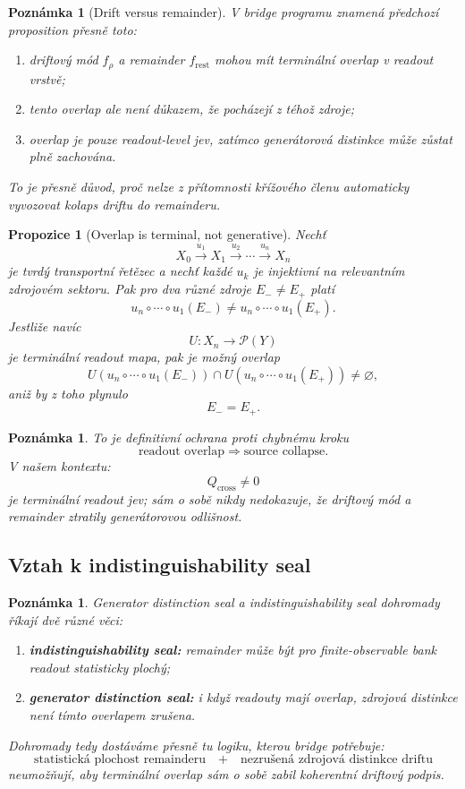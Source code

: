 \documentclass[11pt,a4paper]{article}
\newtheorem{remark}[theorem]{Poznámka}
\newtheorem{proposition}[theorem]{Propozice}
\begin{document}
\begin{remark}[Drift versus remainder]
V bridge programu znamená předchozí proposition přesně toto:
\begin{enumerate}[label=\textbf{(\arabic*)}]
    \item driftový mód \(f_\rho\) a remainder \(f_{\mathrm{rest}}\) mohou mít terminální overlap v readout vrstvě;
    \item tento overlap ale není důkazem, že pocházejí z téhož zdroje;
    \item overlap je pouze readout-level jev, zatímco generátorová distinkce může zůstat plně zachována.
\end{enumerate}
To je přesně důvod, proč nelze z přítomnosti křížového členu automaticky vyvozovat
kolaps driftu do remainderu.
\end{remark}

\begin{proposition}[Overlap is terminal, not generative]
Nechť
\[
X_0 \xrightarrow{u_1} X_1 \xrightarrow{u_2}\cdots\xrightarrow{u_n} X_n
\]
je tvrdý transportní řetězec a nechť každé \(u_k\) je injektivní na relevantním zdrojovém sektoru.
Pak pro dva různé zdroje \(E_-\neq E_+\) platí
\[
u_n\circ\cdots\circ u_1(E_-)\neq u_n\circ\cdots\circ u_1(E_+).
\]
Jestliže navíc
\[
U:X_n\to \mathcal P(Y)
\]
je terminální readout mapa, pak je možný overlap
\[
U(u_n\circ\cdots\circ u_1(E_-))\cap U(u_n\circ\cdots\circ u_1(E_+))\neq \varnothing,
\]
aniž by z toho plynulo
\[
E_-=E_+.
\]
\end{proposition}

\begin{remark}
To je definitivní ochrana proti chybnému kroku
\[
\text{readout overlap} \Longrightarrow \text{source collapse}.
\]
V našem kontextu:
\[
Q_{\mathrm{cross}}\neq 0
\]
je terminální readout jev; sám o sobě nikdy nedokazuje, že driftový mód a remainder ztratily
generátorovou odlišnost.
\end{remark}

\subsection*{Vztah k indistinguishability seal}

\begin{remark}
Generator distinction seal a indistinguishability seal dohromady říkají dvě různé věci:
\begin{enumerate}[label=\textbf{(\arabic*)}]
    \item \textbf{indistinguishability seal:}
    remainder může být pro finite-observable bank readout statisticky plochý;
    \item \textbf{generator distinction seal:}
    i když readouty mají overlap, zdrojová distinkce není tímto overlapem zrušena.
\end{enumerate}
Dohromady tedy dostáváme přesně tu logiku, kterou bridge potřebuje:
\[
\text{statistická plochost remainderu}
\quad+\quad
\text{nezrušená zdrojová distinkce driftu}
\]
neumožňují, aby terminální overlap sám o sobě zabil koherentní driftový podpis.
\end{remark}
\end{document}

